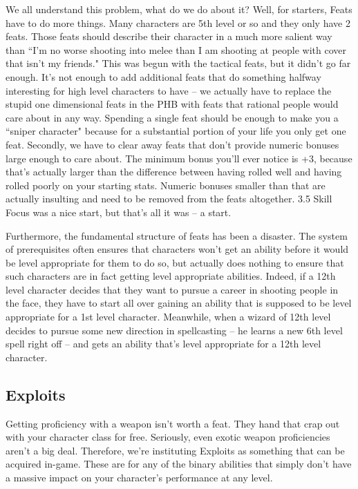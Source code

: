 We all understand this problem, what do we do about it? Well, for starters, Feats have to do more things. Many characters are 5th level or so and they only have 2 feats. Those feats should describe their character in a much more salient way than ``I'm no worse shooting into melee than I am shooting at people with cover that isn't my friends." This was begun with the tactical feats, but it didn't go far enough. It's not enough to add additional feats that do something halfway interesting for high level characters to have -- we actually have to replace the stupid one dimensional feats in the PHB with feats that rational people would care about in any way. Spending a single feat should be enough to make you a ``sniper character" because for a substantial portion of your life you only get one feat. Secondly, we have to clear away feats that don't provide numeric bonuses large enough to care about. The minimum bonus you'll ever notice is +3, because that's actually larger than the difference between having rolled well and having rolled poorly on your starting stats. Numeric bonuses smaller than that are actually insulting and need to be removed from the feats altogether. 3.5 Skill Focus was a nice start, but that's all it was -- a start.

Furthermore, the fundamental structure of feats has been a disaster. The system of prerequisites often ensures that characters won't get an ability before it would be level appropriate for them to do so, but actually does nothing to ensure that such characters are in fact getting level appropriate abilities. Indeed, if a 12th level character decides that they want to pursue a career in shooting people in the face, they have to start all over gaining an ability that is supposed to be level appropriate for a 1st level character. Meanwhile, when a wizard of 12th level decides to pursue some new direction in spellcasting -- he learns a new 6th level spell right off -- and gets an ability that's level appropriate for a 12th level character.

\subsection{Exploits}
Getting proficiency with a weapon isn't worth a feat. They hand that crap out with your character class for free. Seriously, even exotic weapon proficiencies aren't a big deal. Therefore, we're instituting Exploits as something that can be acquired in-game. These are for any of the binary abilities that simply don't have a massive impact on your character's performance at any level.

